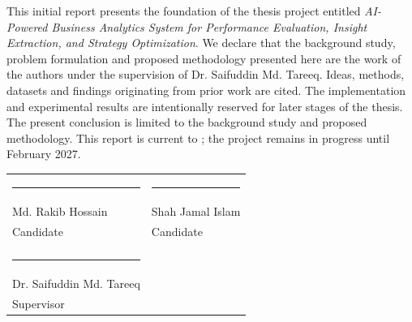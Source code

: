 This initial report presents the foundation of the thesis project entitled
\emph{AI-Powered Business Analytics System for Performance Evaluation,
Insight Extraction, and Strategy Optimization}. We declare that the background
study, problem formulation and proposed methodology presented here are the work
of the authors under the supervision of Dr. Saifuddin Md. Tareeq. Ideas,
methods, datasets and findings originating from prior work are cited. The
implementation and experimental results are intentionally reserved for later
stages of the thesis. The present conclusion is limited to the background study
and proposed methodology. This report is current to \reportdate; the project
remains in progress until February 2027.

\vspace{1.2cm}
\begin{tabularx}{\textwidth}{X X}
  \rule{5.2cm}{0.4pt} & \rule{5.2cm}{0.4pt} \\
  Md. Rakib Hossain & Shah Jamal Islam \\
  Candidate & Candidate \\
  \\[1.0cm]
  \rule{5.2cm}{0.4pt} & \\
  Dr. Saifuddin Md. Tareeq & \\
  Supervisor &
\end{tabularx}
